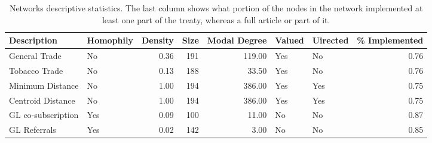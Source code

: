 \begin{table}[ht]
\centering
\begin{tabular}{llrrrllr}
  \toprule
Description & Homophily & Density & Size & Modal Degree & Valued & Uirected & \% Implemented \\ 
  \midrule
General Trade & No & 0.36 & 191 & 119.00 & Yes & No & 0.76 \\ 
  Tobacco Trade & No & 0.13 & 188 & 33.50 & Yes & No & 0.76 \\ 
  Minimum Distance & No & 1.00 & 194 & 386.00 & Yes & Yes & 0.75 \\ 
  Centroid Distance & No & 1.00 & 194 & 386.00 & Yes & Yes & 0.75 \\ 
  GL co-subscription & Yes & 0.09 & 100 & 11.00 & No & No & 0.87 \\ 
  GL Referrals  & Yes & 0.02 & 142 & 3.00 & No & No & 0.85 \\ 
   \bottomrule
\end{tabular}
\caption{Networks descriptive statistics. The last column shows what portion of the nodes in the network implemented at least one part of the treaty, whereas a full article or part of it.} 
\end{table}
